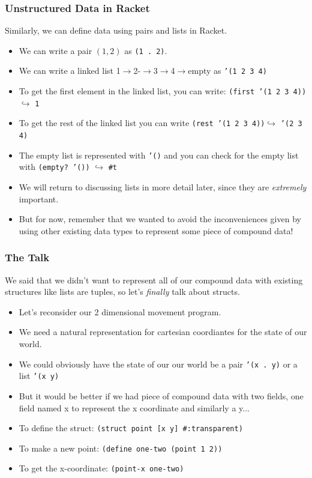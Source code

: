 \documentclass{beamer}
\begin{document}
\begin{frame}
  \frametitle{Unstructured Data in Racket}
  Similarly, we can define data using pairs and lists in Racket.
  \begin{itemize}
  \item<2-> We can write a pair $(1, 2)$ as \texttt{(1 . 2)}.
  \item<3-> We can write a linked list 1$\rightarrow$2-$\rightarrow$3$\rightarrow$4$\rightarrow$empty as \texttt{'(1 2 3 4)}
  \item<4-> To get the first element in the linked list, you can write:
    \texttt{(first '(1 2 3 4))}$\hookrightarrow$ \texttt{1}
  \item<5-> To get the rest of the linked list you can write
    \texttt{(rest '(1 2 3 4))}$\hookrightarrow$ \texttt{'(2 3 4)}
  \item<6-> The empty list is represented with \texttt{'()}
    and you can check for the empty list with \texttt{(empty? '())}
    $\hookrightarrow$ \texttt{\#t}
  \item<7-> We will return to discussing lists in more detail later,
    since they are \emph{extremely} important.
  \item<8-> But for now, remember that we wanted to avoid the inconveniences
    given by using other existing data types to represent some piece of compound data!
  \end{itemize}
\end{frame}

\begin{frame}
  \frametitle{The Talk}
  We said that we didn't want to represent all of our compound data with
  existing structures like lists are tuples, so
  let's \emph{finally} talk about structs.
  \begin{itemize}
  \item<2-> Let's reconsider our 2 dimensional movement program.
  \item<3-> We need a natural representation for cartesian coordiantes for the state of our world.
  \item<4-> We could obviously have the state of our our world be a pair
    \texttt{'(x . y)} or a list \texttt{'(x  y)}
  \item<5-> But it would be better if we had piece of compound data with two fields, one field named x to represent the x coordinate and similarly a y...
  \item<6-> To define the struct: \texttt{(struct point [x y] \#:transparent)}
  \item<7-> To make a new point: \texttt{(define one-two (point 1 2))}
  \item<8-> To get the x-coordinate: \texttt{(point-x one-two)}
  \end{itemize}
\end{frame}
\end{document}
